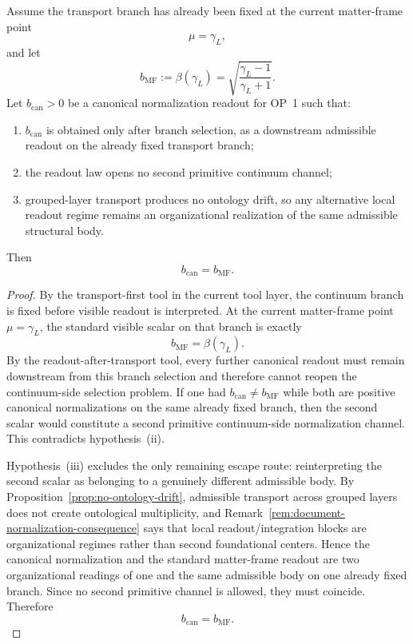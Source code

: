 \begin{theorem}
\label{thm:working-op1-admissible-readout-uniqueness}
Assume the transport branch has already been fixed at the current matter-frame point
\[
  \mu=\gamma_L,
\]
and let
\[
  b_{\mathrm{MF}}:=\beta(\gamma_L)=\sqrt{\frac{\gamma_L-1}{\gamma_L+1}}.
\]
Let \(b_{\mathrm{can}}>0\) be a canonical normalization readout for OP~1 such that:
\begin{enumerate}[label=(\roman*), leftmargin=2em]
  \item \(b_{\mathrm{can}}\) is obtained only after branch selection, as a downstream admissible readout on the already fixed transport branch;
  \item the readout law opens no second primitive continuum channel;
  \item grouped-layer transport produces no ontology drift, so any alternative local readout regime remains an organizational realization of the same admissible structural body.
\end{enumerate}
Then
\[
  b_{\mathrm{can}}=b_{\mathrm{MF}}.
\]
\end{theorem}

\begin{proof}
By the transport-first tool in the current tool layer, the continuum branch is fixed before visible readout is interpreted. At the current matter-frame point \(\mu=\gamma_L\), the standard visible scalar on that branch is exactly
\[
  b_{\mathrm{MF}}=\beta(\gamma_L).
\]
By the readout-after-transport tool, every further canonical readout must remain downstream from this branch selection and therefore cannot reopen the continuum-side selection problem. If one had \(b_{\mathrm{can}}\neq b_{\mathrm{MF}}\) while both are positive canonical normalizations on the same already fixed branch, then the second scalar would constitute a second primitive continuum-side normalization channel. This contradicts hypothesis~(ii).

Hypothesis~(iii) excludes the only remaining escape route: reinterpreting the second scalar as belonging to a genuinely different admissible body. By Proposition~\ref{prop:no-ontology-drift}, admissible transport across grouped layers does not create ontological multiplicity, and Remark~\ref{rem:document-normalization-consequence} says that local readout/integration blocks are organizational regimes rather than second foundational centers. Hence the canonical normalization and the standard matter-frame readout are two organizational readings of one and the same admissible body on one already fixed branch. Since no second primitive channel is allowed, they must coincide. Therefore
\[
  b_{\mathrm{can}}=b_{\mathrm{MF}}.
\]
\end{proof}

